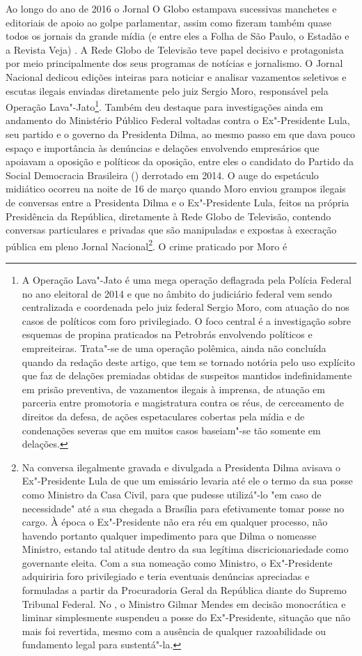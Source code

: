 Ao longo do ano de 2016 o Jornal O Globo estampava sucessivas manchetes
e editoriais de apoio ao golpe parlamentar, assim como fizeram também
quase todos os jornais da grande mídia (e entre eles a Folha de São
Paulo, o Estadão e a Revista Veja) . A Rede Globo de Televisão teve
papel decisivo e protagonista por meio principalmente dos seus programas
de notícias e jornalismo. O Jornal Nacional dedicou edições inteiras
para noticiar e analisar vazamentos seletivos e escutas ilegais enviadas
diretamente pelo juiz Sergio Moro, responsável pela Operação
Lava"-Jato\footnote{A Operação Lava"-Jato é uma mega operação deflagrada
  pela Polícia Federal no ano eleitoral de 2014 e que no âmbito do
  judiciário federal vem sendo centralizada e coordenada pelo juiz
  federal Sergio Moro, com atuação do  nos casos de políticos com
  foro privilegiado. O foco central é a investigação sobre esquemas de
  propina praticados na Petrobrás envolvendo políticos e empreiteiras.
  Trata"-se de uma operação polêmica, ainda não concluída quando da
  redação deste artigo, que tem se tornado notória pelo uso explícito
  que faz de delações premiadas obtidas de suspeitos mantidos
  indefinidamente em prisão preventiva, de vazamentos ilegais à
  imprensa, de atuação em parceria entre promotoria e magistratura
  contra os réus, de cerceamento de direitos da defesa, de ações
  espetaculares cobertas pela mídia e de condenações severas que em
  muitos casos baseiam"-se tão somente em delações.}. Também deu destaque
para investigações ainda em andamento do Ministério Público Federal
voltadas contra o Ex"-Presidente Lula, seu partido e o governo da
Presidenta Dilma, ao mesmo passo em que dava pouco espaço e importância
às denúncias e delações envolvendo empresários que apoiavam a oposição e
políticos da oposição, entre eles o candidato do Partido da Social
Democracia Brasileira () derrotado em 2014. O auge do espetáculo
midiático ocorreu na noite de 16 de março quando Moro enviou grampos
ilegais de conversas entre a Presidenta Dilma e o Ex"-Presidente Lula,
feitos na própria Presidência da República, diretamente à Rede Globo de
Televisão, contendo conversas particulares e privadas que são
manipuladas e expostas à execração pública em pleno Jornal
Nacional\footnote{Na conversa ilegalmente gravada e divulgada a
  Presidenta Dilma avisava o Ex"-Presidente Lula de que um emissário
  levaria até ele o termo da sua posse como Ministro da Casa Civil, para
  que pudesse utilizá"-lo "em caso de necessidade" até a sua chegada a
  Brasília para efetivamente tomar posse no cargo. À época o
  Ex"-Presidente não era réu em qualquer processo, não havendo portanto
  qualquer impedimento para que Dilma o nomeasse Ministro, estando tal
  atitude dentro da sua legítima discricionariedade como governante
  eleita. Com a sua nomeação como Ministro, o Ex"-Presidente adquiriria
  foro privilegiado e teria eventuais denúncias apreciadas e formuladas
  a partir da Procuradoria Geral da República diante do Supremo Tribunal
  Federal. No , o Ministro Gilmar Mendes em decisão monocrática e
  liminar simplesmente suspendeu a posse do Ex"-Presidente, situação que
  não mais foi revertida, mesmo com a ausência de qualquer razoabilidade
  ou fundamento legal para sustentá"-la.}. O crime praticado por Moro é
